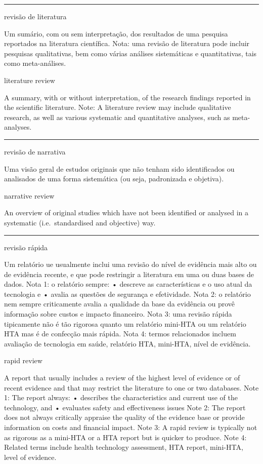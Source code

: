 \documentclass[
  openany]{book}
\begin{document}
\begin{center}\rule{0.5\linewidth}{0.5pt}\end{center}

revisão de literatura

Um sumário, com ou sem interpretação, dos resultados de uma pesquisa reportados na literatura científica. Nota: uma revisão de literatura pode incluir pesquisas qualitativas, bem como várias análises sistemáticas e quantitativas, tais como meta-análises.

literature review

A summary, with or without interpretation, of the research findings reported in the scientific literature. Note: A literature review may include qualitative research, as well as various systematic and quantitative analyses, such as meta-analyses.

\begin{center}\rule{0.5\linewidth}{0.5pt}\end{center}

revisão de narrativa

Uma visão geral de estudos originais que não tenham sido identificados ou analisados de uma forma sistemática (ou seja, padronizada e objetiva).

narrative review

An overview of original studies which have not been identified or analysed in a systematic (i.e.~standardised and objective) way.

\begin{center}\rule{0.5\linewidth}{0.5pt}\end{center}

revisão rápida

Um relatório ue usualmente inclui uma revisão do nível de evidência mais alto ou de evidência recente, e que pode restringir a literatura em uma ou duas bases de dados. Nota 1: o relatório sempre: • descreve as características e o uso atual da tecnologia e • avalia as questões de segurança e efetividade. Nota 2: o relatório nem sempre criticamente avalia a qualidade da base da evidência ou provê informação sobre custos e impacto financeiro. Nota 3: uma revisão rápida tipicamente não é tão rigorosa quanto um relatório mini-HTA ou um relatório HTA mas é de confecção mais rápida. Nota 4: termos relacionados incluem avaliação de tecnologia em saúde, relatório HTA, mini-HTA, nível de evidência.

rapid review

A report that usually includes a review of the highest level of evidence or of recent evidence and that may restrict the literature to one or two databases. Note 1: The report always:
• describes the characteristics and current use of the technology, and
• evaluates safety and effectiveness issues Note 2: The report does not always critically appraise the quality of the evidence base or provide information on costs and financial impact. Note 3: A rapid review is typically not as rigorous as a mini-HTA or a HTA report but is quicker to produce. Note 4: Related terms include health technology assessment, HTA report, mini-HTA, level of evidence.
\end{document}
